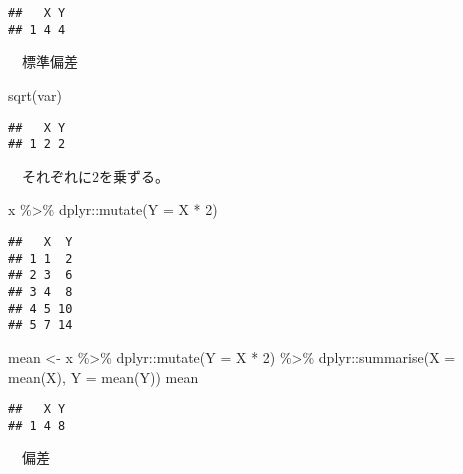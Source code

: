 \documentclass[
  12pt,
]{book}
\newenvironment{Shaded}{\begin{snugshade}}{\end{snugshade}}
\newcommand{\AttributeTok}[1]{\textcolor[rgb]{0.77,0.63,0.00}{#1}}
\newcommand{\DecValTok}[1]{\textcolor[rgb]{0.00,0.00,0.81}{#1}}
\newcommand{\FunctionTok}[1]{\textcolor[rgb]{0.00,0.00,0.00}{#1}}
\newcommand{\NormalTok}[1]{#1}
\newcommand{\OtherTok}[1]{\textcolor[rgb]{0.56,0.35,0.01}{#1}}
\newcommand{\SpecialCharTok}[1]{\textcolor[rgb]{0.00,0.00,0.00}{#1}}
\begin{document}
\begin{verbatim}
##   X Y
## 1 4 4
\end{verbatim}

　標準偏差

\begin{Shaded}
\begin{Highlighting}[]
\FunctionTok{sqrt}\NormalTok{(var)}
\end{Highlighting}
\end{Shaded}

\begin{verbatim}
##   X Y
## 1 2 2
\end{verbatim}

　それぞれに\(2\)を乗ずる。

\begin{Shaded}
\begin{Highlighting}[]
\NormalTok{x }\SpecialCharTok{\%\textgreater{}\%} 
\NormalTok{  dplyr}\SpecialCharTok{::}\FunctionTok{mutate}\NormalTok{(}\AttributeTok{Y =}\NormalTok{ X }\SpecialCharTok{*} \DecValTok{2}\NormalTok{)}
\end{Highlighting}
\end{Shaded}

\begin{verbatim}
##   X  Y
## 1 1  2
## 2 3  6
## 3 4  8
## 4 5 10
## 5 7 14
\end{verbatim}

\begin{Shaded}
\begin{Highlighting}[]
\NormalTok{mean }\OtherTok{\textless{}{-}}\NormalTok{ x }\SpecialCharTok{\%\textgreater{}\%} 
\NormalTok{  dplyr}\SpecialCharTok{::}\FunctionTok{mutate}\NormalTok{(}\AttributeTok{Y =}\NormalTok{ X }\SpecialCharTok{*} \DecValTok{2}\NormalTok{) }\SpecialCharTok{\%\textgreater{}\%} 
\NormalTok{  dplyr}\SpecialCharTok{::}\FunctionTok{summarise}\NormalTok{(}\AttributeTok{X =} \FunctionTok{mean}\NormalTok{(X), }\AttributeTok{Y =} \FunctionTok{mean}\NormalTok{(Y))}
\NormalTok{mean}
\end{Highlighting}
\end{Shaded}

\begin{verbatim}
##   X Y
## 1 4 8
\end{verbatim}

　偏差

\begin{Shaded}
\end{Shaded}
\end{document}
